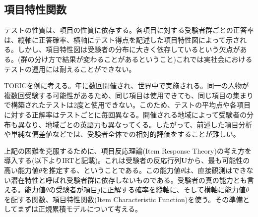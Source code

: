 \documentclass[12pt]{jarticle}
\numberwithin{equation}{subsection}
\begin{document}
\subsection{項目特性関数}
テストの性質は、項目の性質に依存する。各項目に対する受験者群ごとの正答率は、縦軸に正答確率、横軸にテスト得点を記述した項目特性図によって示される。しかし、項目特性図は受験者の分布に大きく依存しているという欠点がある。(群の分け方で結果が変わることがあるということ)これでは実社会におけるテストの運用には耐えることができない。

TOEICを例に考える。年に数回開催され、世界中で実施される。同一の人物が複数回受験する可能性があるため、同じ項目は使用できても、同じ項目の集まりで構築されたテストは2度と使用できない。このため、テストの平均点や各項目に対する正解率はテストごとに毎回異なる。開催される地域によって受験者の分布も異なり、地域ごとの英語力も異なってくる。したがって、前述した項目分析や単純な偏差値などでは、受験者全体での相対的評価をすることが難しい。

上記の困難を克服するために、項目反応理論(Item Response Theory)の考え方を導入する(以下よりIRTと記載)。これは受験者の反応行列$\boldsymbol{U}$から、最も可能性の高い能力値$\theta$を推定する、ということである。この能力値$\theta$は、直接観測はできない潜在特性と呼ばれ受験者群に依存しないものである。受験者の真の能力とも言える。能力値$\theta$の受験者が項目$j$に正解する確率を縦軸に、そして横軸に能力値$\theta$を配する関数、項目特性関数(Item Characteristic Function)を使う。その準備としてまずは正規累積モデルについて考える。
\end{document}
